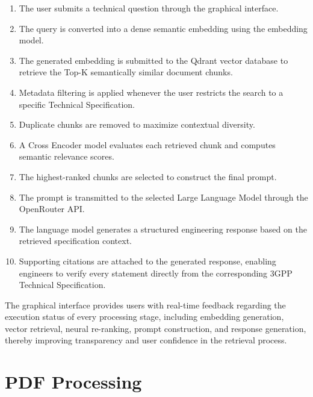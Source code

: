 \begin{enumerate}

\item The user submits a technical question through the graphical interface.

\item The query is converted into a dense semantic embedding using the embedding model.

\item The generated embedding is submitted to the Qdrant vector database to retrieve the Top-K semantically similar document chunks.

\item Metadata filtering is applied whenever the user restricts the search to a specific Technical Specification.

\item Duplicate chunks are removed to maximize contextual diversity.

\item A Cross Encoder model evaluates each retrieved chunk and computes semantic relevance scores.

\item The highest-ranked chunks are selected to construct the final prompt.

\item The prompt is transmitted to the selected Large Language Model through the OpenRouter API.

\item The language model generates a structured engineering response based on the retrieved specification context.

\item Supporting citations are attached to the generated response, enabling engineers to verify every statement directly from the corresponding 3GPP Technical Specification.

\end{enumerate}

The graphical interface provides users with real-time feedback regarding the execution status of every processing stage, including embedding generation, vector retrieval, neural re-ranking, prompt construction, and response generation, thereby improving transparency and user confidence in the retrieval process.
\section{PDF Processing}

